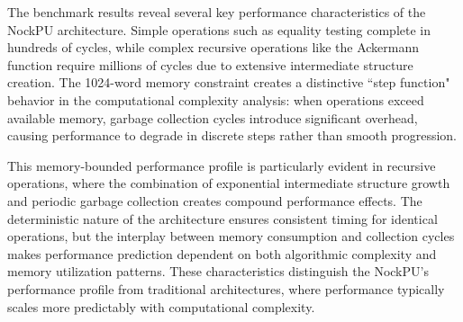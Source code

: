 \documentclass[twoside]{article}
\begin{document}
\begin{table}[h]
\centering
\caption{NockPU performance metrics for 50MHz clock and 16KB memory}
\label{tab:performance-metrics}
\end{table}

\noindent
The benchmark results reveal several key performance characteristics of the NockPU architecture. Simple operations such as equality testing complete in hundreds of cycles, while complex recursive operations like the Ackermann function require millions of cycles due to extensive intermediate structure creation. The 1024-word memory constraint creates a distinctive ``step function" behavior in the computational complexity analysis: when operations exceed available memory, garbage collection cycles introduce significant overhead, causing performance to degrade in discrete steps rather than smooth progression.

This memory-bounded performance profile is particularly evident in recursive operations, where the combination of exponential intermediate structure growth and periodic garbage collection creates compound performance effects. The deterministic nature of the architecture ensures consistent timing for identical operations, but the interplay between memory consumption and collection cycles makes performance prediction dependent on both algorithmic complexity and memory utilization patterns. These characteristics distinguish the NockPU's performance profile from traditional architectures, where performance typically scales more predictably with computational complexity.
\end{document}
